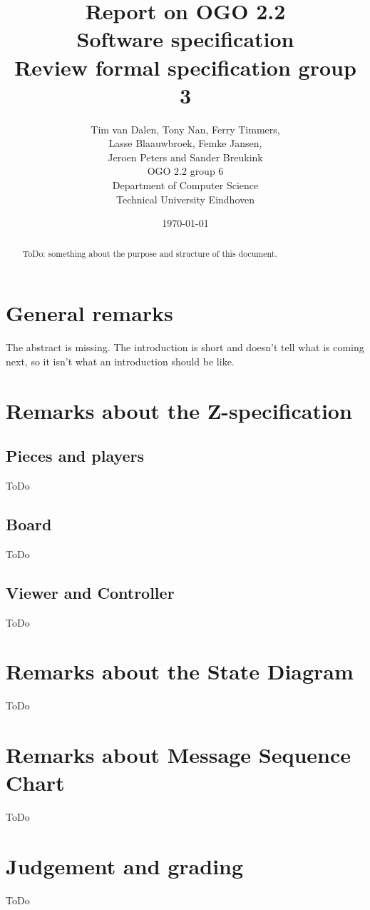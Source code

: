 \documentclass[a4paper,11pt]{article}
\title{Report on OGO 2.2 \\ Software specification\\ Review formal specification group 3}
\author{
        Tim van Dalen, Tony Nan, Ferry Timmers, \\ Lasse Blaauwbroek, Femke Jansen, \\Jeroen Peters and Sander Breukink\\ OGO 2.2 group 6 \\
                Department of Computer Science\\
        Technical University Eindhoven\\
}
\date{\today}
\begin{document}
\maketitle

\begin{abstract}
ToDo: something about the purpose and structure of this document.
\end{abstract}

\newpage
	
	\tableofcontents
	\newpage
	
	\section{General remarks}
    The abstract is missing. The introduction is short and doesn't tell what is coming next, so it isn't what an introduction should be like.
	
	\section{Remarks about the Z-specification}
    \subsection{Pieces and players}
    ToDo
    \subsection{Board}
    ToDo
    \subsection{Viewer and Controller}
    ToDo

	\section{Remarks about the State Diagram}
    ToDo

    \section{Remarks about Message Sequence Chart}
    ToDo

    \section{Judgement and grading}
    ToDo
\end{document}
